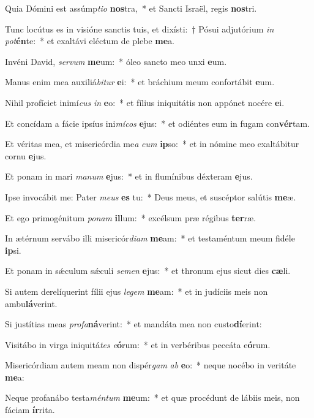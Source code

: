 \item Quia Dómini est assúmp\textit{ti}\textit{o} \textbf{nos}tra,~* et Sancti Israël, regis \textbf{nos}tri.
\item Tunc locútus es in visióne sanctis tuis, et dixísti:~† Pósui adjutórium \textit{in} \textit{pot}\textbf{én}te:~* et exaltávi eléctum de plebe \textbf{me}a.
\item Invéni David, \textit{ser}\textit{vum} \textbf{me}um:~* óleo sancto meo unxi \textbf{e}um.
\item Manus enim mea auxiliá\textit{bi}\textit{tur} \textbf{e}i:~* et bráchium meum confortábit \textbf{e}um.
\item Nihil profíciet inimí\textit{cus} \textit{in} \textbf{e}o:~* et fílius iniquitátis non appónet nocére \textbf{e}i.
\item Et concídam a fácie ipsíus ini\textit{mí}\textit{cos} \textbf{e}jus:~* et odiéntes eum in fugam con\textbf{vér}tam.
\item Et véritas mea, et misericórdia me\textit{a} \textit{cum} \textbf{ip}so:~* et in nómine meo exaltábitur cornu \textbf{e}jus.
\item Et ponam in mari \textit{ma}\textit{num} \textbf{e}jus:~* et in flumínibus déxteram \textbf{e}jus.
\item Ipse invocábit me: Pater \textit{me}\textit{us} \textbf{es} tu:~* Deus meus, et suscéptor salútis \textbf{me}æ.
\item Et ego primogénitum \textit{po}\textit{nam} \textbf{il}lum:~* excélsum præ régibus \textbf{ter}ræ.
\item In ætérnum servábo illi misericór\textit{di}\textit{am} \textbf{me}am:~* et testaméntum meum fidéle \textbf{ip}si.
\item Et ponam in sǽculum sǽculi \textit{se}\textit{men} \textbf{e}jus:~* et thronum ejus sicut dies \textbf{cæ}li.
\item Si autem derelíquerint fílii ejus \textit{le}\textit{gem} \textbf{me}am:~* et in judíciis meis non ambu\textbf{lá}verint.
\item Si justítias meas \textit{pro}\textit{fa}\textbf{ná}verint:~* et mandáta mea non custo\textbf{dí}erint:
\item Visitábo in virga iniquitá\textit{tes} \textit{e}\textbf{ó}rum:~* et in verbéribus peccáta e\textbf{ó}rum.
\item Misericórdiam autem meam non dispér\textit{gam} \textit{ab} \textbf{e}o:~* neque nocébo in veritáte \textbf{me}a:
\item Neque profanábo testa\textit{mén}\textit{tum} \textbf{me}um:~* et quæ procédunt de lábiis meis, non fáciam \textbf{ír}rita.

